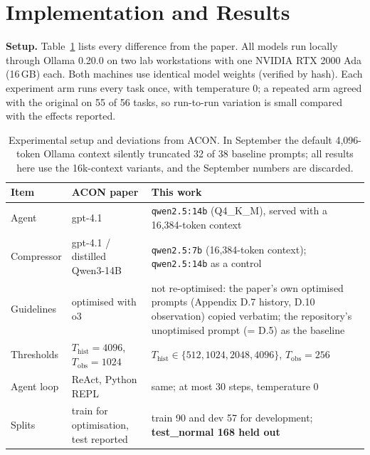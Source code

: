 \documentclass[10pt,a4paper]{article}
\begin{document}
\section{Implementation and Results}

\textbf{Setup.} Table~\ref{tab:setup} lists every difference from the paper. All
models run locally through Ollama 0.20.0 on two lab workstations with one
NVIDIA RTX 2000 Ada (16\,GB) each. Both machines use identical model weights
(verified by hash). Each experiment arm runs every task once, with temperature
0; a repeated arm agreed with the original on 55 of 56 tasks, so run-to-run
variation is small compared with the effects reported.

\begin{table}[h]
\centering
\scriptsize
\renewcommand{\arraystretch}{1.12}
\begin{tabular}{p{}p{}p{}}
\toprule
\textbf{Item} & \textbf{ACON paper} & \textbf{This work}\\
\midrule
Agent & gpt-4.1 & \texttt{qwen2.5:14b} (Q4\_K\_M), served with a 16,384-token context\\
Compressor & gpt-4.1 / distilled Qwen3-14B & \texttt{qwen2.5:7b} (16,384-token context); \texttt{qwen2.5:14b} as a control\\
Guidelines & optimised with o3 & not re-optimised: the paper's own optimised prompts (Appendix D.7 history, D.10 observation) copied verbatim; the repository's unoptimised prompt (= D.5) as the baseline\\
Thresholds & $T_{\mathrm{hist}}=4096$, $T_{\mathrm{obs}}=1024$ & $T_{\mathrm{hist}}\in\{512,1024,2048,4096\}$, $T_{\mathrm{obs}}=256$\\
Agent loop & ReAct, Python REPL & same; at most 30 steps, temperature 0\\
Splits & train for optimisation, test reported & train 90 and dev 57 for development; \textbf{test\_normal 168 held out}\\
\bottomrule
\end{tabular}
\caption{Experimental setup and deviations from ACON. In September the default
4,096-token Ollama context silently truncated 32 of 38 baseline prompts; all
results here use the 16k-context variants, and the September numbers are
discarded.}
\label{tab:setup}
\end{table}
\end{document}
